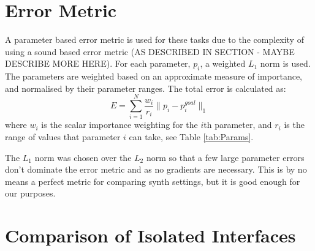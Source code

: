 \documentclass[11pt, oneside]{report}   	%
\begin{document}
\section{Error Metric}
A parameter based error metric is used for these tasks due to the complexity of using a sound based error metric (AS DESCRIBED IN SECTION - MAYBE DESCRIBE MORE HERE). 
For each parameter, $p_i$, a weighted $L_1$ norm is used. The parameters are weighted based on an approximate measure of importance, and normalised by their parameter ranges. The total error is calculated as:
\begin{equation}
E = \sum_{i=1}^{N}\frac{w_i}{r_i} \| p_i - p_i^{goal} \|_1 
\end{equation}
where $w_i$ is the scalar importance weighting for the $i$th parameter, and $r_i$ is the range of values that parameter $i$ can take, see Table \ref{tab:Params}.

The $L_1$ norm was chosen over the $L_2$ norm so that a few large parameter errors don't dominate the error metric and as no gradients are necessary.
This is by no means a perfect metric for comparing synth settings, but it is good enough for our purposes.

\section{Comparison of Isolated Interfaces}
\end{document}
